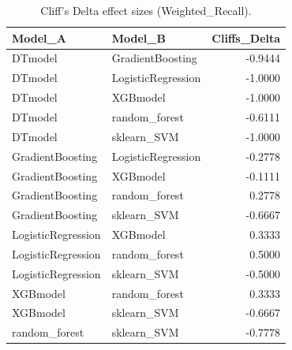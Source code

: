 \begin{table}[t]
\centering
\begin{tabular}{llr}
\toprule
Model_A & Model_B & Cliffs_Delta \\
\midrule
DTmodel & GradientBoosting & -0.9444 \\
DTmodel & LogisticRegression & -1.0000 \\
DTmodel & XGBmodel & -1.0000 \\
DTmodel & random_forest & -0.6111 \\
DTmodel & sklearn_SVM & -1.0000 \\
GradientBoosting & LogisticRegression & -0.2778 \\
GradientBoosting & XGBmodel & -0.1111 \\
GradientBoosting & random_forest & 0.2778 \\
GradientBoosting & sklearn_SVM & -0.6667 \\
LogisticRegression & XGBmodel & 0.3333 \\
LogisticRegression & random_forest & 0.5000 \\
LogisticRegression & sklearn_SVM & -0.5000 \\
XGBmodel & random_forest & 0.3333 \\
XGBmodel & sklearn_SVM & -0.6667 \\
random_forest & sklearn_SVM & -0.7778 \\
\bottomrule
\end{tabular}
\caption{Cliff's Delta effect sizes (Weighted_Recall).}
\label{tab:cliffs_Weighted_Recall}
\end{table}